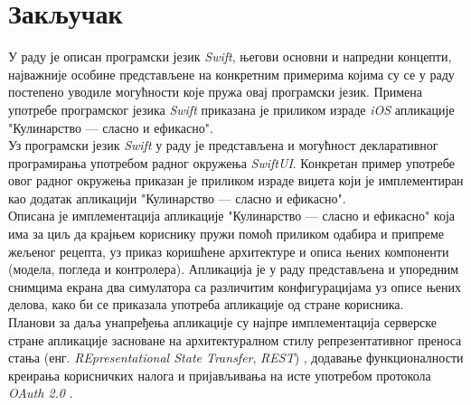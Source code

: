 \documentclass[12pt,oneside]{memoir}
\begin{document}



\chapter{Закључак}

\indent У раду је описан програмски језик \textit{Swift}, његови основни и напредни концепти, најважније особине представљене на конкретним примерима којима су се у раду постепено уводиле могућности које пружа овај програмски језик. Примена употребе програмског језика \textit{Swift} приказана је приликом израде \textit{iOS} апликације "Кулинарство --- сласно и ефикасно". 
\\
\indent Уз програмски језик \textit{Swift} у раду је представљена и могућност декларативног програмирања употребом радног окружења \textit{SwiftUI}. Конкретан пример употребе овог радног окружења приказан је приликом израде виџета који је имплементиран као додатак апликацији "Кулинарство --- сласно и ефикасно".
\\
\indent Описана је имплементација апликације "Кулинарство --- сласно и ефикасно" која има за циљ да крајњем кориснику пружи помоћ приликом одабира и припреме жељеног рецепта, уз приказ коришћене архитектуре и описа њених компоненти (модела, погледа и контролера). Апликација је у раду представљена и упоредним снимцима екрана два симулатора са различитим конфигурацијама уз описе њених делова, како би се приказала употреба апликације од стране корисника.
\\
\indent Планови за даља унапређења апликације су најпре имплементација серверске стране апликације засноване на архитектуралном стилу репрезентативног преноса стања (енг. \textit{REpresentational State Transfer}, \textit{REST}) \cite{REST}, додавање функционалности креирања корисничких налога и пријављивања на исте употребом протокола \textit{OAuth 2.0} \cite{OAuth}. 

\literatura
\end{document}
